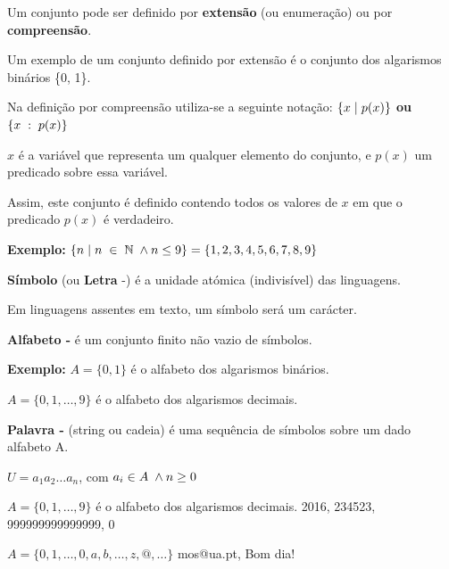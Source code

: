 \documentclass{article}
\begin{document}
\begin{flushleft}
  \item Um conjunto pode ser definido por \textbf{extensão} (ou
  enumeração) ou por \textbf{compreensão}.
  \item Um exemplo de um conjunto definido por extensão é o
  conjunto dos algarismos binários \{0, 1\}.
  \item Na definição por compreensão utiliza-se a seguinte
  notação: \textbf{$\{x \hspace{1mm}| \hspace{1mm} p(x)\}$ ou $\{x \hspace{1mm}: \hspace{1mm} p(x)\}$}
  \item $x$ é a variável que representa um qualquer elemento do
  conjunto, e $p(x)$ um predicado sobre essa variável.
  \item Assim, este conjunto é definido contendo todos os valores
  de $x$ em que o predicado $p(x)$ é verdadeiro.
  \item \textbf{Exemplo:} $\{ n \hspace{1mm} | \hspace{1mm} n \hspace{1mm} \in \hspace{1mm} \mathbb{N} \hspace{1mm} \wedge n \le 9 \} = \{1,2,3,4,5,6,7,8,9\} $
  \item \textbf{Símbolo} (ou \textbf{Letra} -) é a unidade atómica (indivisível)
  das linguagens.
  \item Em linguagens assentes em texto, um símbolo será um
  carácter.
  \item \textbf{Alfabeto -} é um conjunto finito não vazio de símbolos.
  \item \textbf{Exemplo:} $A = \{0, 1\}$ é o alfabeto dos algarismos binários.
  
  $A = \{0, 1, \dots, 9\}$ é o alfabeto dos algarismos decimais.

  \item \textbf{Palavra -} (string ou cadeia) é uma sequência de
  símbolos sobre um dado alfabeto A.

  $U = a_1 a_2 \dots a_n$, com $a_i \in A \hspace{1mm} \wedge n \ge 0$

  \item $A = \{0,1, \dots, 9\}$ é o alfabeto dos algarismos decimais.
  2016, 234523, 999999999999999, 0

  $A = \{0,1, \dots,0,a,b, \dots, z, @, \dots \}$ mos@ua.pt, Bom dia!


\end{flushleft}
\end{document}
